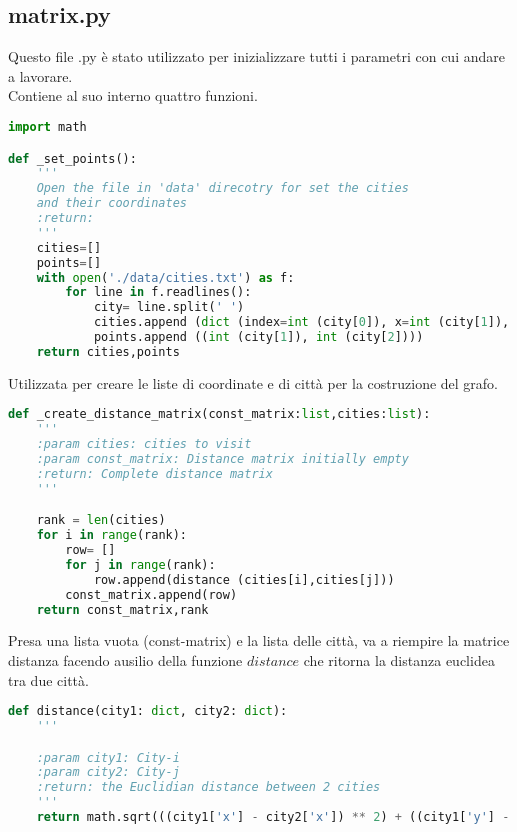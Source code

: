 \documentclass[a4paper,12pt]{report}
\begin{document}
\subsection{matrix.py}
Questo file .py è stato utilizzato per inizializzare tutti i parametri con cui andare a lavorare.\\
Contiene al suo interno quattro funzioni.
\begin{lstlisting}[language=Python]
import math

def _set_points():
    '''
    Open the file in 'data' direcotry for set the cities
    and their coordinates
    :return:
    '''
    cities=[]
    points=[]
    with open('./data/cities.txt') as f:
        for line in f.readlines():
            city= line.split(' ')
            cities.append (dict (index=int (city[0]), x=int (city[1]), y=int (city[2])))
            points.append ((int (city[1]), int (city[2])))
    return cities,points
\end{lstlisting}
Utilizzata per creare le liste di coordinate e di città per la costruzione del grafo.\\
\begin{lstlisting}[language=Python]
def _create_distance_matrix(const_matrix:list,cities:list):
    '''
    :param cities: cities to visit
    :param const_matrix: Distance matrix initially empty
    :return: Complete distance matrix
    '''

    rank = len(cities)
    for i in range(rank):
        row= []
        for j in range(rank):
            row.append(distance (cities[i],cities[j]))
        const_matrix.append(row)
    return const_matrix,rank
\end{lstlisting}
Presa una lista vuota (const-matrix) e la lista delle città, va a riempire la matrice distanza facendo ausilio della funzione $distance$ che ritorna la distanza euclidea tra due città.
\begin{lstlisting}[language=Python]
def distance(city1: dict, city2: dict):
    '''

    :param city1: City-i
    :param city2: City-j
    :return: the Euclidian distance between 2 cities
    '''
    return math.sqrt(((city1['x'] - city2['x']) ** 2) + ((city1['y'] - city2['y']) ** 2))
\end{lstlisting}
\end{document}
